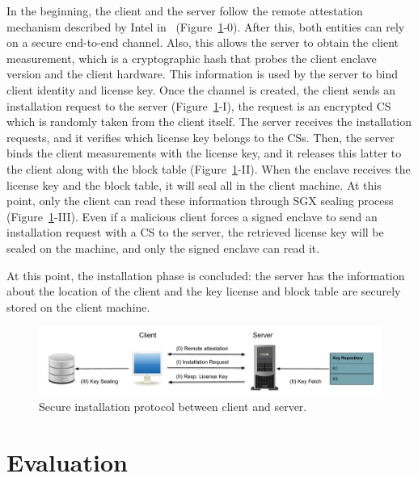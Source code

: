 In the beginning, the client and the server follow the remote attestation 
mechanism described by
Intel in~\citep{sgxremoteatt} (Figure~\ref{fig:installation}-0).
After this, both entities can rely on a secure end-to-end channel.
Also, this allows the server to obtain the client measurement, which is a 
cryptographic hash
that probes the client enclave version and the client hardware.
This information is used by the server to bind client identity and license key.
Once the channel is created, the client sends an installation request to the 
server
(Figure~\ref{fig:installation}-I), the request is an encrypted CS
which is randomly taken from the client itself.
The server receives the installation requests, and it verifies which license 
key belongs
to the CSs.
Then, the server binds the client measurements with the license key, and it 
releases this
latter to the client along with the block table 
(Figure~\ref{fig:installation}-II).
When the enclave receives the license key and the block table, it will seal all 
in the client machine.
At this point, only the client can read these information through SGX sealing 
process (Figure~\ref{fig:installation}-III).
Even if a malicious client forces a signed enclave to send an installation 
request
with a CS to the server, 
the retrieved license key will be sealed on the machine, and only the signed 
enclave can read it.

At this point, the installation phase is concluded: the server has the 
information about
the location of the client and the key license and block table are securely 
stored 
on the client machine.

\begin{figure}[t]
	\centering
	\includegraphics[width=0.9\linewidth]{fig_c3/installation.pdf}
	\caption{Secure installation protocol between client and server.}
	\label{fig:installation}
\end{figure}

\section{Evaluation}
\label{sec:experiment}

